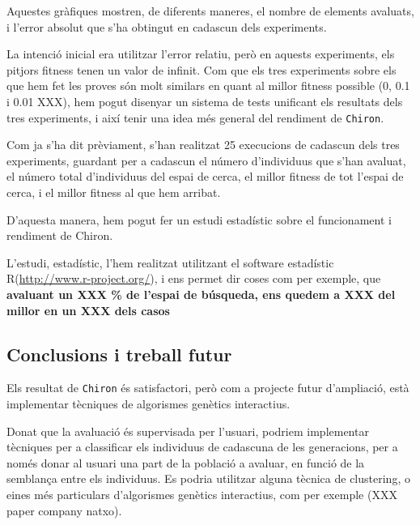 	Aquestes gràfiques mostren, de diferents maneres, el nombre de elements
	avaluats, i l'error absolut que s'ha obtingut en cadascun dels experiments.

	La intenció inicial era utilitzar l'error relatiu, però en aquests
	experiments, els pitjors fitness tenen un valor de infinit.  Com que els
	tres experiments sobre els que hem fet les proves són molt similars en quant
	al millor fitness possible (0, 0.1 i 0.01 XXX), hem pogut disenyar un
	sistema de tests unificant els resultats dels tres experiments, i així tenir
	una idea més general del rendiment de \texttt{Chiron}.

	Com ja s'ha dit prèviament, s'han  realitzat 25 execucions de cadascun dels
	tres experiments, guardant per a cadascun el número d'individuus que s'han
	avaluat, el número total d'individuus del espai de cerca, el millor fitness
	de tot l'espai de cerca, i el millor fitness al que hem arribat.

	D'aquesta manera, hem pogut fer un estudi estadístic sobre el funcionament i
	rendiment de Chiron.

	L'estudi, estadístic, l'hem realitzat utilitzant el software estadístic
	R(\url{http://www.r-project.org/}), i ens permet dir coses com per exemple, que \textbf{avaluant un XXX
	\% de l'espai de búsqueda, ens quedem a XXX del millor en un XXX dels casos}


\subsection{Conclusions i treball futur} %
	\label{sub:CConclusions i treball futur}

	Els resultat de \texttt{Chiron} és satisfactori, però com a projecte futur
	d'ampliació, està implementar tècniques de algorismes genètics interactius.

	Donat que la avaluació és supervisada per l'usuari, podriem implementar
	tècniques per a classificar els individuus de cadascuna de les generacions,
	per a només donar al usuari una part de la població a avaluar, en funció de
	la semblança entre els individuus.  Es podria utilitzar alguna tècnica de
	clustering, o eines més particulars d'algorismes genètics interactius, com
	per exemple (XXX paper company natxo).

%

